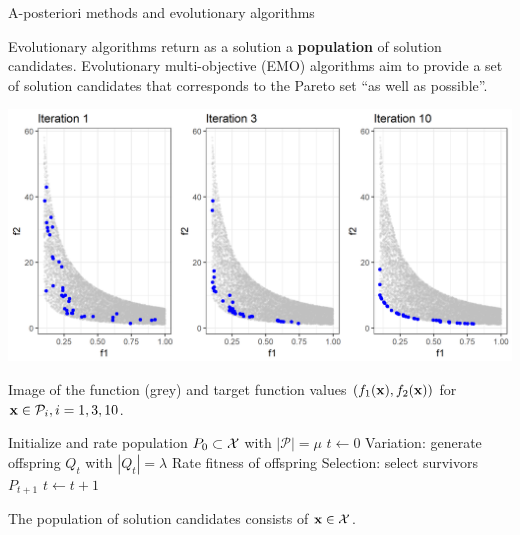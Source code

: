 \begin{frame}[allowframebreaks]{A-posteriori methods and evolutionary algorithms}

Evolutionary algorithms return as a solution a \textbf{population} of solution candidates. Evolutionary multi-objective (EMO) algorithms aim to provide a set of solution candidates that corresponds to the Pareto set \enquote{as well as possible}.

\vspace*{-0.4cm}

\begin{center}
\includegraphics[width = 0.8\linewidth]{images/EA-steps.png}
\end{center}

\vspace*{-0.4cm}

\begin{footnotesize}
Image of the function (grey) and target function values $(f_1(\mathbf{x}), f_2(\mathbf{x}))$ for $\mathbf{x} \in \mathcal{P}_i, i = 1, 3, 10$.
\end{footnotesize}

\framebreak

\begin{algorithm}[H]
  \begin{center}
  \caption{Evolutionary algorithm}
    \begin{algorithmic}[1]
    \State Initialize and rate population $P_0 \subset \mathcal{X}$ with $|\mathcal{P}| = \mu$
    \State $t \leftarrow 0$
      \Repeat
        \State Variation: generate offspring $Q_t$ with $|Q_t| = \lambda$
        \State Rate fitness of offspring
        \State Selection: select survivors $P_{t + 1}$
 		\State $t \leftarrow t + 1$
            \vspace*{-0.3cm}
    \end{algorithmic}
    \end{center}
\end{algorithm}

The population of solution candidates consists of $\mathbf{x} \in \mathcal{X}$.

\end{frame}


